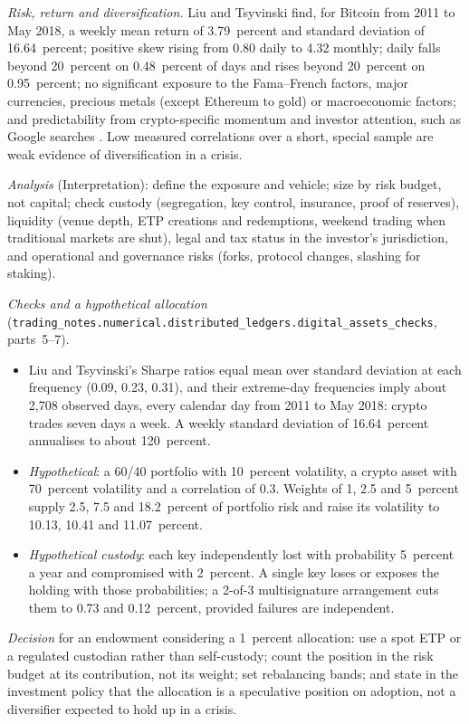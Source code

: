 \begin{qfmethod}
\emph{Risk, return and diversification.} Liu and Tsyvinski find, for Bitcoin from 2011 to May 2018, a weekly mean return of 3.79~percent and standard deviation of 16.64~percent; positive skew rising from 0.80 daily to 4.32 monthly; daily falls beyond 20~percent on 0.48~percent of days and rises beyond 20~percent on 0.95~percent; no significant exposure to the Fama--French factors, major currencies, precious metals (except Ethereum to gold) or macroeconomic factors; and predictability from crypto-specific momentum and investor attention, such as Google searches \citep[NBER WP 24877, August 2018, pp.~1--2 and Table~1, pp.~6--7]{roadmap-crypto-risks-returns}. Low measured correlations over a short, special sample are weak evidence of diversification in a crisis.

\emph{Analysis} (Interpretation): define the exposure and vehicle; size by risk budget, not capital; check custody (segregation, key control, insurance, proof of reserves), liquidity (venue depth, ETP creations and redemptions, weekend trading when traditional markets are shut), legal and tax status in the investor's jurisdiction, and operational and governance risks (forks, protocol changes, slashing for staking).

 \emph{Checks and a hypothetical allocation} (\nolinkurl{trading_notes.numerical.distributed_ledgers.digital_assets_checks}, parts~5--7).
\begin{itemize}
\item Liu and Tsyvinski's Sharpe ratios equal mean over standard deviation at each frequency (0.09, 0.23, 0.31), and their extreme-day frequencies imply about 2{,}708 observed days, every calendar day from 2011 to May 2018: crypto trades seven days a week. A weekly standard deviation of 16.64~percent annualises to about 120~percent.
\item \emph{Hypothetical}: a 60/40 portfolio with 10~percent volatility, a crypto asset with 70~percent volatility and a correlation of 0.3. Weights of 1, 2.5 and 5~percent supply 2.5, 7.5 and 18.2~percent of portfolio risk and raise its volatility to 10.13, 10.41 and 11.07~percent.
\item \emph{Hypothetical custody}: each key independently lost with probability 5~percent a year and compromised with 2~percent. A single key loses or exposes the holding with those probabilities; a 2-of-3 multisignature arrangement cuts them to 0.73 and 0.12~percent, provided failures are independent.
\end{itemize}
\emph{Decision} for an endowment considering a 1~percent allocation: use a spot ETP or a regulated custodian rather than self-custody; count the position in the risk budget at its contribution, not its weight; set rebalancing bands; and state in the investment policy that the allocation is a speculative position on adoption, not a diversifier expected to hold up in a crisis.


\end{qfmethod}
